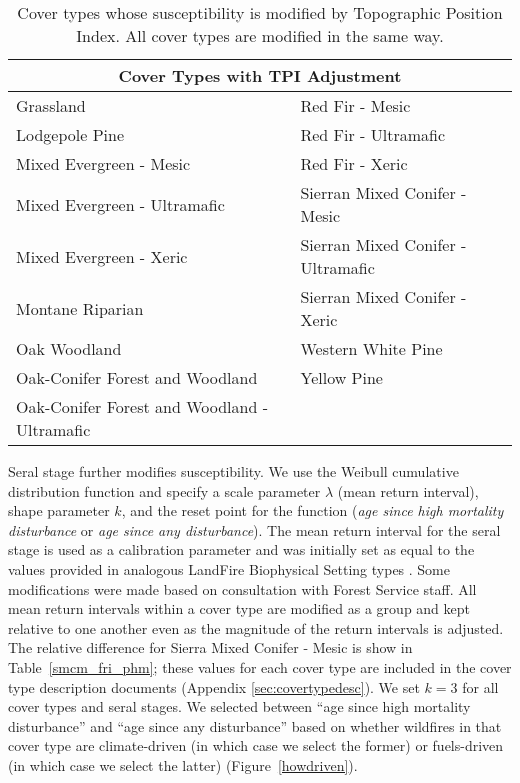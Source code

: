 \begin{itemize}
\begin{table}[htbp]
\small
\centering
\caption{Cover types whose susceptibility is modified by Topographic Position Index. All cover types are modified in the same way.}
\label{covtpi}
\begin{tabular}{ll}
\hline
\multicolumn{2}{c}{\textbf{Cover Types with TPI Adjustment}} \\
\hline
Grassland     									& Red Fir - Mesic   					\\
Lodgepole Pine    								& Red Fir - Ultramafic					\\
Mixed Evergreen - Mesic							& Red Fir - Xeric    					\\
Mixed Evergreen - Ultramafic     				& Sierran Mixed Conifer - Mesic    		\\
Mixed Evergreen - Xeric 						& Sierran Mixed Conifer - Ultramafic 	\\
Montane Riparian								& Sierran Mixed Conifer - Xeric 		\\
Oak Woodland 									& Western White Pine					\\
Oak-Conifer Forest and Woodland 				& Yellow Pine 							\\
Oak-Conifer Forest and Woodland - Ultramafic 	&										\\
\hline
\end{tabular}

\end{table}

Seral stage further modifies susceptibility. We use the Weibull cumulative distribution function and specify a scale parameter $\lambda$ (mean return interval), shape parameter $k$, and the reset point for the function (\emph{age since high mortality disturbance} or \emph{age since any disturbance}). The mean return interval for the seral stage is used as a calibration parameter and was initially set as equal to the values provided in analogous LandFire Biophysical Setting types \citep{Landfire2007}. Some modifications were made based on consultation with Forest Service staff. All mean return intervals within a cover type are modified as a group and kept relative to one another even as the magnitude of the return intervals is adjusted. The relative difference for Sierra Mixed Conifer - Mesic is show in Table~\ref{smcm_fri_phm}; these values for each cover type are included in the cover type description documents (Appendix \ref{sec:covertypedesc}). We set $k=3$ for all cover types and seral stages. We selected between ``age since high mortality disturbance'' and ``age since any disturbance'' based on whether wildfires in that cover type are climate-driven (in which case we select the former) or fuels-driven (in which case we select the latter) (Figure~\ref{howdriven}).


\end{itemize}
